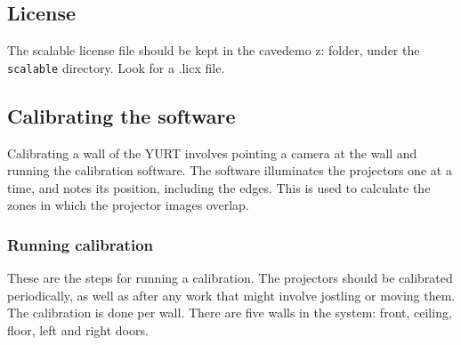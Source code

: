 \documentclass[11pt]{article}
\newcommand{\yurt}{YURT\xspace}
\newcommand{\cmd}[1]{\texttt{#1}\xspace}
\begin{document}
\subsection{License}

The scalable license file should be kept in the cavedemo z: folder,
under the \cmd{scalable} directory.  Look for a .licx file.

\subsection{Calibrating the software}

Calibrating a wall of the \yurt involves pointing a camera at the wall
and running the calibration software.  The software illuminates the
projectors one at a time, and notes its position, including the edges.
This is used to calculate the zones in which the projector images
overlap.

\subsubsection{Running calibration}

These are the steps for running a calibration.  The projectors should
be calibrated periodically, as well as after any work that might
involve jostling or moving them.  The calibration is done per wall.
There are five walls in the system: front, ceiling, floor, left and
right doors.
\end{document}
